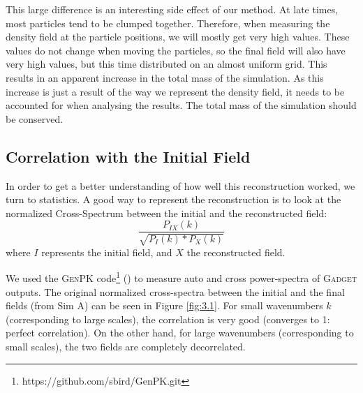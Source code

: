 This large difference is an interesting side effect of our method. At late times, most particles tend to be clumped together. Therefore, when measuring the density field at the particle positions, we will mostly get very high values. These values do not change when moving the particles, so the final field will also have very high values, but this time distributed on an almost uniform grid. This results in an apparent increase in the total mass of the simulation. As this increase is just a result of the way we represent the density field, it needs to be accounted for when analysing the results. The total mass of the simulation should be conserved.

\subsection{Correlation with the Initial Field}


In order to get a better understanding of how well this reconstruction worked, we turn to statistics. A good way to represent the reconstruction  is to look at the normalized Cross-Spectrum between the initial and the reconstructed field: $$ \frac{P_{IX}(k)}{\sqrt{P_I(k) * P_X(k)}} $$ where $I$ represents the initial field, and $X$ the reconstructed field. 

We used the \textsc{GenPK} code\footnote{https://github.com/sbird/GenPK.git} (\cite{2017ascl.soft06006B}) to measure auto and cross power-spectra of \textsc{Gadget} outputs. The original normalized cross-spectra between the initial and the final fields (from Sim A) can be seen in Figure \ref{fig:3.1}. For small wavenumbers $k$ (corresponding to large scales), the correlation is very good (converges to 1: perfect correlation). On the other hand, for large wavenumbers (corresponding to small scales), the two fields are completely decorrelated. 

